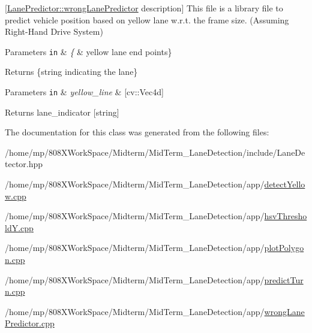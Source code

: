\mbox{[}\hyperlink{classLanePredictor_ac930fa52cdede9afa25bbf7cafd8c6b5}{Lane\+Predictor\+::wrong\+Lane\+Predictor} description\mbox{]} This file is a library file to predict vehicle position based on yellow lane w.\+r.\+t. the frame size. (Assuming Right-\/\+Hand Drive System)


\begin{DoxyParams}[1]{Parameters}
\mbox{\tt in}  & {\em \{} & yellow lane end points\}\\
\hline
\end{DoxyParams}
\begin{DoxyReturn}{Returns}
\{string indicating the lane\}
\end{DoxyReturn}

\begin{DoxyParams}[1]{Parameters}
\mbox{\tt in}  & {\em yellow\+\_\+line} & \mbox{[}cv\+::\+Vec4d\mbox{]} \\
\hline
\end{DoxyParams}
\begin{DoxyReturn}{Returns}
lane\+\_\+indicator \mbox{[}string\mbox{]} 
\end{DoxyReturn}


The documentation for this class was generated from the following files\+:\begin{DoxyCompactItemize}
\item 
/home/mp/808\+X\+Work\+Space/\+Midterm/\+Mid\+Term\+\_\+\+Lane\+Detection/include/Lane\+Detector.\+hpp\item 
/home/mp/808\+X\+Work\+Space/\+Midterm/\+Mid\+Term\+\_\+\+Lane\+Detection/app/\hyperlink{detectYellow_8cpp}{detect\+Yellow.\+cpp}\item 
/home/mp/808\+X\+Work\+Space/\+Midterm/\+Mid\+Term\+\_\+\+Lane\+Detection/app/\hyperlink{hsvThresholdY_8cpp}{hsv\+Threshold\+Y.\+cpp}\item 
/home/mp/808\+X\+Work\+Space/\+Midterm/\+Mid\+Term\+\_\+\+Lane\+Detection/app/\hyperlink{plotPolygon_8cpp}{plot\+Polygon.\+cpp}\item 
/home/mp/808\+X\+Work\+Space/\+Midterm/\+Mid\+Term\+\_\+\+Lane\+Detection/app/\hyperlink{predictTurn_8cpp}{predict\+Turn.\+cpp}\item 
/home/mp/808\+X\+Work\+Space/\+Midterm/\+Mid\+Term\+\_\+\+Lane\+Detection/app/\hyperlink{wrongLanePredictor_8cpp}{wrong\+Lane\+Predictor.\+cpp}\end{DoxyCompactItemize}
